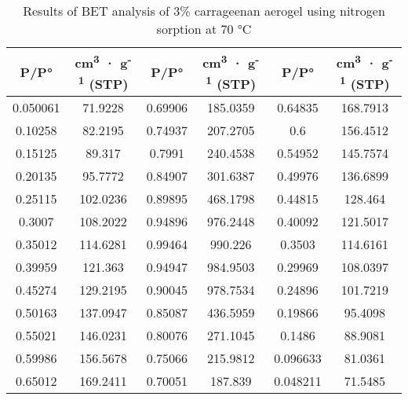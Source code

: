 \documentclass[a4paper,12pt]{article}
\begin{document}
\begin{table}[H]
\centering
\caption{Results of BET analysis of 3\% carrageenan aerogel using nitrogen sorption at 70 °C}
\label{tab4}
\begin{tabular}{@{}cccccc@{}}
\toprule
\textbf{P/P°} & \textbf{cm\textsuperscript{3} · g\textsuperscript{-1} (STP)} & \textbf{P/P°} & \textbf{cm\textsuperscript{3} · g\textsuperscript{-1} (STP)} & \textbf{P/P°} & \textbf{cm\textsuperscript{3} · g\textsuperscript{-1} (STP)} \\ \midrule
0.050061 & 71.9228 & 0.69906 & 185.0359 & 0.64835 & 168.7913 \\
0.10258 & 82.2195 & 0.74937 & 207.2705 & 0.6 & 156.4512 \\
0.15125 & 89.317 & 0.7991 & 240.4538 & 0.54952 & 145.7574 \\
0.20135 & 95.7772 & 0.84907 & 301.6387 & 0.49976 & 136.6899 \\
0.25115 & 102.0236 & 0.89895 & 468.1798 & 0.44815 & 128.464 \\
0.3007 & 108.2022 & 0.94896 & 976.2448 & 0.40092 & 121.5017 \\
0.35012 & 114.6281 & 0.99464 & 990.226 & 0.3503 & 114.6161 \\
0.39959 & 121.363 & 0.94947 & 984.9503 & 0.29969 & 108.0397 \\
0.45274 & 129.2195 & 0.90045 & 978.7534 & 0.24896 & 101.7219 \\
0.50163 & 137.0947 & 0.85087 & 436.5959 & 0.19866 & 95.4098 \\
0.55021 & 146.0231 & 0.80076 & 271.1045 & 0.1486 & 88.9081 \\
0.59986 & 156.5678 & 0.75066 & 215.9812 & 0.096633 & 81.0361 \\
0.65012 & 169.2411 & 0.70051 & 187.839 & 0.048211 & 71.5485 \\ \bottomrule
\end{tabular}
\end{table}
\end{document}
